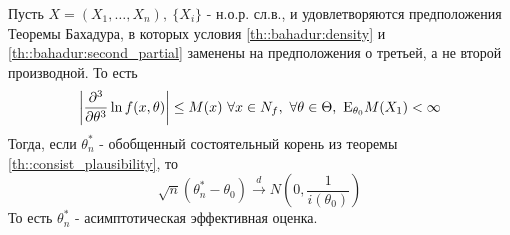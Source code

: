 \begin{theorem}
    \label{th::asympt_consist}
    Пусть \(X = (X_1, \ldots, X_n),\ \{X_i\}\) - н.о.р. сл.в., и
    удовлетворяются предположения Теоремы Бахадура, в которых условия
    \ref{th::bahadur:density} и \ref{th::bahadur:second_partial} заменены на
    предположения о третьей, а не второй производной. То есть
    \[\left\lvert \frac{\partial^3}{\partial \theta^3} \ln f(x, \theta) \right\rvert  \leq M(x) \ \forall x\in N_f,\ \forall\theta\in\Theta,\ \E_{\theta_0}M(X_1) < \infty\]
    Тогда, если \(\theta^*_n\) - обобщенный состоятельный корень из теоремы \ref{th::consist_plausibility}, то
    \[\sqrt{n}(\theta^*_n - \theta_0) \xrightarrow{d} N(0, \frac{1}{i(\theta_0)})\]
    То есть \(\theta^*_n\) - асимптотическая эффективная оценка.
\end{theorem}

